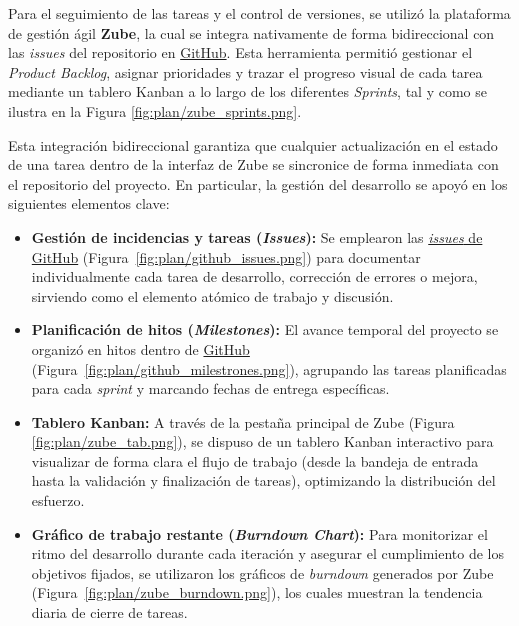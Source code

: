 Para el seguimiento de las tareas y el control de versiones, se utilizó la
plataforma de gestión ágil \textbf{Zube}, la cual se integra nativamente de
forma bidireccional con las \textit{issues} del repositorio en
\href{https://github.com/zcc1001/tfg-topics}{GitHub}. Esta herramienta permitió
gestionar el \textit{Product Backlog}, asignar prioridades y trazar el progreso
visual de cada tarea mediante un tablero Kanban a lo largo de los diferentes
\textit{Sprints}, tal y como se ilustra en la Figura
\ref{fig:plan/zube_sprints.png}.


Esta integración bidireccional garantiza que cualquier actualización en el
estado de una tarea dentro de la interfaz de Zube se sincronice de forma
inmediata con el repositorio del proyecto. En particular, la gestión del
desarrollo se apoyó en los siguientes elementos clave:
\begin{itemize}
    \item \textbf{Gestión de incidencias y tareas (\textit{Issues}):} Se emplearon las \href{https://github.com/zcc1001/tfg-topics/issues}{\textit{issues} de GitHub} (Figura~\ref{fig:plan/github_issues.png}) para documentar individualmente cada tarea de desarrollo, corrección de errores o mejora, sirviendo como el elemento atómico de trabajo y discusión.
    \item \textbf{Planificación de hitos (\textit{Milestones}):} El avance temporal del proyecto se organizó en hitos dentro de \href{https://github.com/zcc1001/tfg-topics/milestones}{GitHub} (Figura~\ref{fig:plan/github_milestrones.png}), agrupando las tareas planificadas para cada \textit{sprint} y marcando fechas de entrega específicas.
    \item \textbf{Tablero Kanban:} A través de la pestaña principal de Zube (Figura \ref{fig:plan/zube_tab.png}), se dispuso de un tablero Kanban interactivo para visualizar de forma clara el flujo de trabajo (desde la bandeja de entrada hasta la validación y finalización de tareas), optimizando la distribución del esfuerzo.
    \item \textbf{Gráfico de trabajo restante (\textit{Burndown Chart}):} Para monitorizar el ritmo del desarrollo durante cada iteración y asegurar el cumplimiento de los objetivos fijados, se utilizaron los gráficos de \textit{burndown} generados por Zube (Figura~\ref{fig:plan/zube_burndown.png}), los cuales muestran la tendencia diaria de cierre de tareas.
\end{itemize}

